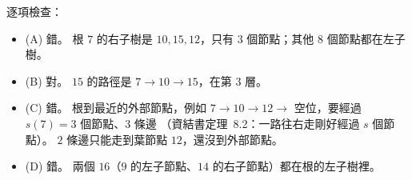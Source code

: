 \begin{pastsoln}
逐項檢查：
\begin{itemize}
\item (A) 錯。 根 $7$ 的右子樹是 $10, 15, 12$，只有 $3$ 個節點；其他 $8$ 個節點都在左子樹。
\item (B) 對。 $15$ 的路徑是 $7 \to 10 \to 15$，在第 $3$ 層。
\item (C) 錯。 根到最近的外部節點，例如 $7 \to 10 \to 12 \to$ 空位，要經過 $s(7) = 3$ 個節點、$3$ 條邊
（資結書定理~8.2：一路往右走剛好經過 $s$ 個節點）。 $2$ 條邊只能走到葉節點 $12$，還沒到外部節點。
\item (D) 錯。 兩個 $16$（$9$ 的左子節點、$14$ 的右子節點）都在根的左子樹裡。
\end{itemize}
\end{pastsoln}
